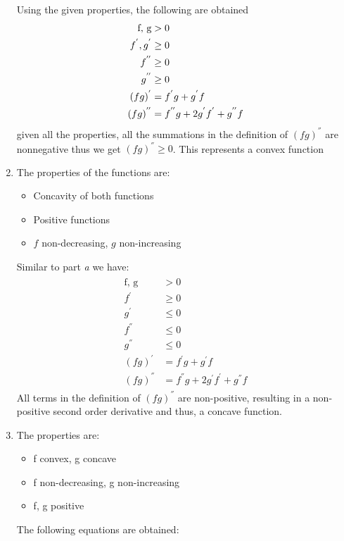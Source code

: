 \documentclass[a4paper]{article}
\begin{document}
\begin{Large}
\begin{enumerate}[label=\alph*)]
		Using the given properties, the following are obtained
		\begin{align}
			\begin{split}
			\text{f, g} & >0
			\\
			f^{'}, \space g^{'} &\geq 0
			\\
			f^{''} & \geq 0
			\\
			g^{''} & \geq 0
			\\
			(fg)^{'} & =f^{'}g+g^{'}f
			\\
			(fg)^{''} & =f^{''}g+2g^{'}f^{'}+g^{''}f
			\end{split}
		\end{align}
		given all the properties, all the summations in the definition of $ (fg)^{''}$ are nonnegative thus we get $ (fg)^{''} \geq 0 $. This represents a convex function
		\item The properties of the functions are:
		\begin{itemize}
			\item 	Concavity of both functions
			\item 	Positive functions
			\item 	$ f $ non-decreasing, $ g $ non-increasing
		\end{itemize}
		Similar to part \textit{a} we have:
				\begin{align}
		\begin{split}
		\text{f, g} & >0
		\\
		f^{'} &\geq 0
		\\
		g^{'} &\leq 0
		\\
		f^{''} & \leq 0
		\\
		g^{''} & \leq 0
		\\
		(fg)^{'} & =f^{'}g+g^{'}f
		\\
		(fg)^{''} & =f^{''}g+2g^{'}f^{'}+g^{''}f
		\end{split}
		\end{align}
		All terms in the definition of $ (fg)^{''} $ are non-positive, resulting in a non-positive second order derivative and thus, a concave function.
		\item The properties are:
		\begin{itemize}
			\item f convex, g concave
			\item f non-decreasing, g non-increasing
			\item f, g positive
		\end{itemize}
		The following equations are obtained:
		\begin{align}

\end{align}
\end{enumerate}
\end{Large}
\end{document}
